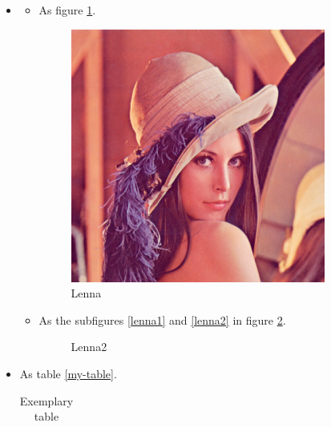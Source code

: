 \documentclass[en, twoside]{assignment}
\begin{document}
    \begin{sol}
        \begin{itemize}
            \item[(1)]
            \begin{itemize}
                \item[(a)] As figure \ref{Lenna}.
                \begin{figure}[hbt!]
                    \centering
                    \includegraphics[width=.2\textwidth]{Lenna.jpg}
                    \caption{Lenna}
                    \label{Lenna}
                \end{figure}
                \item[(b)] As the subfigures \ref{lenna1} and \ref{lenna2} in figure \ref{Lenna2}.
                \begin{figure}[hbt!]
                    \centering
                    \caption{Lenna2}
                    \label{Lenna2}
                \end{figure}
            \end{itemize}
            \item[(2)] As table \ref{my-table}.
            \begin{center}
                \begin{longtable}{ccccc}
                    \caption{Exemplary table}

\end{longtable}
\end{center}
\end{itemize}
\end{sol}
\end{document}
